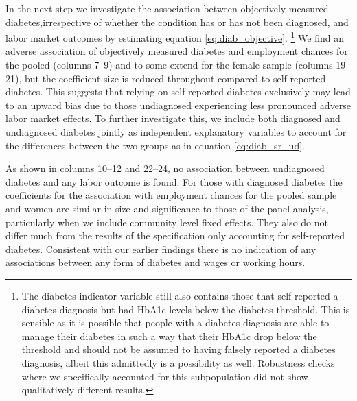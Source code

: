 \documentclass[12pt,english,british]{article}
\begin{document}
In the next step we investigate the association between objectively measured
diabetes,irrespective of whether
the condition has or has not been diagnosed, and labor market outcomes by estimating equation \ref{eq:diab_objective}. \footnote{The diabetes indicator
variable still also contains those that self-reported a diabetes diagnosis
but had \ac{HbA1c} levels below the diabetes threshold. This is sensible as it is possible that people with a diabetes diagnosis are able to manage their diabetes in such a way that their \ac{HbA1c} drop below the threshold and should not be assumed to having falsely reported a diabetes diagnosis, albeit this admittedly is a possibility as well. Robustness checks where we specifically accounted for this subpopulation
did not show qualitatively different results.}  We find an adverse association of objectively measured diabetes and employment
chances for the pooled (columns 7--9) and to some extend for the female sample (columns 19--21), but the coefficient size is reduced throughout compared to self-reported diabetes. This suggests that relying on self-reported
diabetes exclusively may lead to an upward bias due to those undiagnosed experiencing less pronounced adverse labor market effects.
To further investigate this, we include both diagnosed and undiagnosed diabetes jointly as independent explanatory variables to account for the differences between the two groups as in equation \ref{eq:diab_sr_ud}.

As shown in columns 10--12 and 22--24, no association between undiagnosed
diabetes and any labor outcome is found. For those with diagnosed
diabetes the coefficients for the association with employment chances
 for the pooled sample and women are similar in size and significance to those of the panel analysis, particularly when we include community level fixed effects. They also do not differ much from the results of the specification only accounting for self-reported diabetes. Consistent with our earlier findings there is no indication of any associations between any form of diabetes and wages or working hours. 
 
\end{document}
